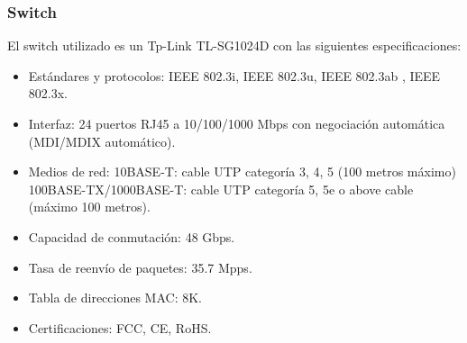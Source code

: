 
\subsubsection{Switch}
El switch utilizado es un Tp-Link TL-SG1024D con las siguientes especificaciones:
\begin{itemize}
	\item Estándares y protocolos: IEEE 802.3i, IEEE 802.3u, IEEE 802.3ab , IEEE 802.3x.
	\item Interfaz: 24 puertos RJ45 a 10/100/1000 Mbps con negociación automática
	(MDI/MDIX automático).
	\item Medios de red: 10BASE-T: cable UTP categoría 3, 4, 5 (100 metros máximo)
	100BASE-TX/1000BASE-T: cable UTP categoría 5, 5e o above cable (máximo 100 metros).
	\item Capacidad de conmutación: 48 Gbps.
	\item Tasa de reenvío de paquetes: 35.7 Mpps.
	\item Tabla de direcciones MAC: 8K.
	\item Certificaciones: FCC, CE, RoHS.
\end{itemize}
